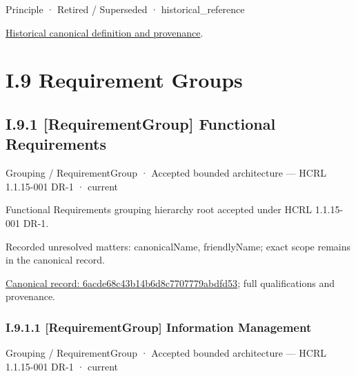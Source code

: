 \label{element:a5dffc0325d44915971eea600bba48f1}
{\small Principle · Retired / Superseded · historical\_reference}\par
\href{../../../../../../../continuum/motivation/principle/a5dffc0325d44915971eea600bba48f1.md}{Historical canonical definition and provenance}.\par
\chapter*{I.9 Requirement Groups}
\label{navigation:I.9}

\section*{I.9.1 [RequirementGroup] Functional Requirements}
\label{navigation:I.9.1}

\label{element:6acde68c43b14b6d8c7707779abdfd53}
{\small Grouping / RequirementGroup · Accepted bounded architecture — HCRL 1.1.15-001 DR-1 · current}\par

Functional Requirements grouping hierarchy root accepted under HCRL 1.1.15-001 DR-1.


{\small Recorded unresolved matters: canonicalName, friendlyName; exact scope remains in the canonical record.}\par
{\footnotesize \href{../../../../../../../continuum/grouping/requirement-group/6acde68c43b14b6d8c7707779abdfd53.md}{Canonical record: 6acde68c43b14b6d8c7707779abdfd53}; full qualifications and provenance.}\par
\subsection*{I.9.1.1 [RequirementGroup] Information Management}
\label{navigation:I.9.1.1}

\label{element:c34c366824ff452eb575345c16db720b}
{\small Grouping / RequirementGroup · Accepted bounded architecture — HCRL 1.1.15-001 DR-1 · current}\par

